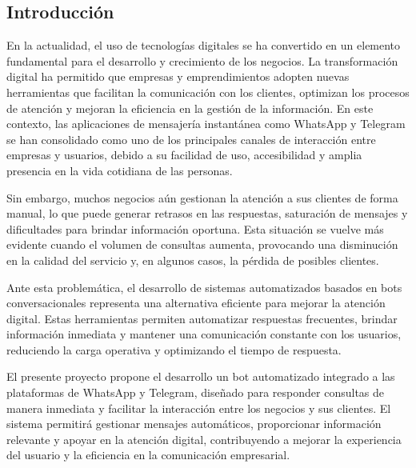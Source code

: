 \subsection{Introducción}

En la actualidad, el uso de tecnologías digitales se ha convertido en un elemento fundamental para el desarrollo y crecimiento de los negocios. La transformación digital ha permitido que empresas y emprendimientos adopten nuevas herramientas que facilitan la comunicación con los clientes, optimizan los procesos de atención y mejoran la eficiencia en la gestión de la información. En este contexto, las aplicaciones de mensajería instantánea como WhatsApp y Telegram se han consolidado como uno de los principales canales de interacción entre empresas y usuarios, debido a su facilidad de uso, accesibilidad y amplia presencia en la vida cotidiana de las personas.

Sin embargo, muchos negocios aún gestionan la atención a sus clientes de forma manual, lo que puede generar retrasos en las respuestas, saturación de mensajes y dificultades para brindar información oportuna. Esta situación se vuelve más evidente cuando el volumen de consultas aumenta, provocando una disminución en la calidad del servicio y, en algunos casos, la pérdida de posibles clientes.

Ante esta problemática, el desarrollo de sistemas automatizados basados en bots conversacionales representa una alternativa eficiente para mejorar la atención digital. Estas herramientas permiten automatizar respuestas frecuentes, brindar información inmediata y mantener una comunicación constante con los usuarios, reduciendo la carga operativa y optimizando el tiempo de respuesta.

El presente proyecto propone el desarrollo un bot automatizado integrado a las plataformas de WhatsApp y Telegram, diseñado para responder consultas de manera inmediata y facilitar la interacción entre los negocios y sus clientes. El sistema permitirá gestionar mensajes automáticos, proporcionar información relevante y apoyar en la atención digital, contribuyendo a mejorar la experiencia del usuario y la eficiencia en la comunicación empresarial.